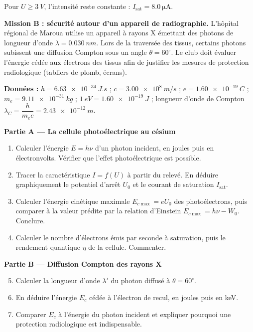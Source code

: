 \documentclass[11pt]{article}
\newcommand{\cle}[1]{{\popxbold\color{popdark}#1}}
\newcounter{popsec}
\newcounter{popsub}
\newcommand{\courssub}[1]{%
  \stepcounter{popsub}%
  \par\vspace{9pt}\noindent{\popxbold\fontsize{11.5}{13}\selectfont\color{popink}{\color{poporange}\thepopsec.\thepopsub}\hspace{6pt}#1}\par\nopagebreak\vspace{4pt}
}
\begin{document}
Pour $U \geq \SI{3}{V}$, l'intensité reste constante : $I_{\text{sat}} = \SI{8,0}{\micro\ampere}$.

\textbf{Mission B : sécurité autour d'un appareil de radiographie.} L'hôpital régional de Maroua utilise un appareil à rayons X émettant des photons de longueur d'onde $\lambda = \SI{0,030}{nm}$. Lors de la traversée des tissus, certains photons subissent une \cle{diffusion Compton} sous un angle $\theta = 60^{\circ}$. Le club doit évaluer l'énergie cédée aux électrons des tissus afin de justifier les mesures de protection radiologique (tabliers de plomb, écrans).

\textbf{Données :} $h = \SI{6,63e-34}{J.s}$ ; $c = \SI{3,00e8}{m/s}$ ; $e = \SI{1,60e-19}{C}$ ; $m_e = \SI{9,11e-31}{kg}$ ; $\SI{1}{eV} = \SI{1,60e-19}{J}$ ; longueur d'onde de Compton $\lambda_C = \dfrac{h}{m_e c} = \SI{2,43e-12}{m}$.

\courssub{Consignes}

\textbf{Partie A — La cellule photoélectrique au césium}
\begin{enumerate}
\item Calculer l'énergie $E = h\nu$ d'un photon incident, en joules puis en électronvolts. Vérifier que l'effet photoélectrique est possible.
\item Tracer la caractéristique $I = f(U)$ à partir du relevé. En déduire graphiquement le potentiel d'arrêt $U_0$ et le courant de saturation $I_{\text{sat}}$.
\item Calculer l'énergie cinétique maximale $E_{c\max} = eU_0$ des photoélectrons, puis comparer à la valeur prédite par la relation d'Einstein $E_{c\max} = h\nu - W_0$. Conclure.
\item Calculer le nombre d'électrons émis par seconde à saturation, puis le rendement quantique $\eta$ de la cellule. Commenter.
\end{enumerate}

\textbf{Partie B — Diffusion Compton des rayons X}
\begin{enumerate}
\setcounter{enumi}{4}
\item Calculer la longueur d'onde $\lambda'$ du photon diffusé à $\theta = 60^{\circ}$.
\item En déduire l'énergie $E_c$ cédée à l'électron de recul, en joules puis en keV.
\item Comparer $E_c$ à l'énergie du photon incident et expliquer pourquoi une protection radiologique est indispensable.
\end{enumerate}
\end{document}
